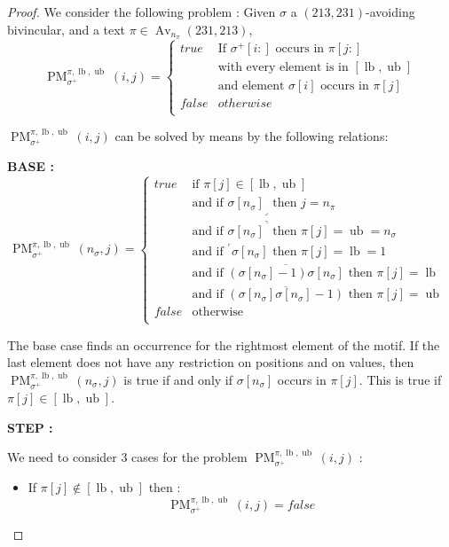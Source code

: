 \documentclass[a4paper]{llncs}
\DeclareMathOperator{\Avd}{Av}
\newcommand\Av[2]{\Avd_{{#1}}({#2})}
\newcommand{\ptext}{\pi}
\newcommand{\pmotif}{\sigma}
\newcommand{\pbmotif}{\pmotif^+}
\DeclareMathOperator{\PMa}{PM}
\newcommand{\PM}[6]{\PMa_{{#1}}^{{#2},{#3},{#4}}({#5},{#6})}
\DeclareMathOperator{\lb}{lb}
\DeclareMathOperator{\ub}{ub}
\begin{document}
\begin{proof}
We consider the following problem :
Given $\pmotif$ a $(213,231)$-avoiding bivincular, and a text $\ptext \in \Av{n_\ptext}{231,213}$,
$$
\PM{\pbmotif}{\ptext}{\lb}{\ub}{i}{j}=
\begin{cases}
	true 	& \text{If $\pbmotif[i:]$ occurs in $\ptext[j:]$}\\
			& \text{with every element is in $[\lb,\ub]$}\\
			& \text{and element $\pmotif[i]$ occurs in $\ptext[j]$ }\\
	false 	& otherwise\\
\end{cases}
$$

$\PM{\pbmotif}{\ptext}{\lb}{\ub}{i}{j}$ can be solved by means by the following relations:

\noindent\textbf{BASE :} \\
$$
\PM{\pbmotif}{\ptext}{\lb}{\ub}{n_\pmotif}{j}=
\begin{cases}
	true 	& \text{if $\ptext[j] \in [\lb,\ub ]$}\\
			& \text{and if ${\pmotif[n_\pmotif]}_\lrcorner$ then $j=n_\ptext$}\\
			& \text{and if ${\pmotif[n_\pmotif]}^\urcorner$ then $\ptext[j]=\ub=n_\pmotif$}\\
			& \text{and if  $^\ulcorner{\pmotif[n_\pmotif]}$ then $\ptext[j]=\lb=1$ } \\
			& \text{and if  $\overline{(\pmotif[n_\pmotif]-1)\pmotif[n_\pmotif] }$ then $\ptext[j]=\lb$ }  \\
			& \text{and if  $\overline{(\pmotif[n_\pmotif]\pmotif[n_\pmotif]-1)}$ then $\ptext[j]=\ub$}  \\

	false	& \text{otherwise} \\
\end{cases}
$$

The base case finds an occurrence for the rightmost element of the motif. If the last element does not have any restriction on positions and on values, then $\PM{\pbmotif}{\ptext}{\lb}{\ub}{n_\pmotif}{j}$ is true if and only if $\pmotif[n_\pmotif]$ occurs in $\ptext[j]$. This is true if $\ptext[j] \in [\lb,\ub]$. 

\noindent\textbf{STEP :} 

We need to consider 3 cases for the problem $\PM{\pbmotif}{\ptext}{\lb}{\ub}{i}{j}$ :
\begin{itemize}
	\item If $\ptext[j] \notin [\lb,\ub]$ then :
	$$
	\PM{\pbmotif}{\ptext}{\lb}{\ub}{i}{j} = false
	$$


\end{itemize}
\end{proof}
\end{document}
